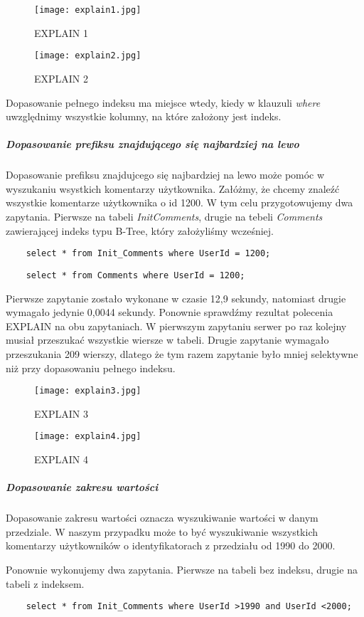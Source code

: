 \begin{figure}[h]
    \texttt{[image: explain1.jpg]} 
    \caption{EXPLAIN 1}
\end{figure}

\begin{figure}[h]
    \texttt{[image: explain2.jpg]} 
    \caption{EXPLAIN 2}
\end{figure}

Dopasowanie pełnego indeksu ma miejsce wtedy, kiedy w klauzuli \textit{where} uwzględnimy wszystkie kolumny, na które założony jest indeks. 
\subparagraph{Dopasowanie prefiksu znajdującego się najbardziej na lewo}\mbox{} 
Dopasowanie prefiksu znajdujcego się najbardziej na lewo może pomóc w wyszukaniu wsystkich komentarzy użytkownika. Załóżmy, że chcemy znaleźć wszystkie komentarze użytkownika o id 1200.
W tym celu przygotowujemy dwa zapytania. Pierwsze na tabeli \textit{Init\textunderscore Comments}, drugie na tebeli \textit{Comments} zawierającej indeks typu B-Tree, który założyliśmy wcześniej.
\begin{verbatim}
    select * from Init_Comments where UserId = 1200;
\end{verbatim}
\begin{verbatim}
    select * from Comments where UserId = 1200;
\end{verbatim}
Pierwsze zapytanie zostało wykonane w czasie 12,9 sekundy, natomiast drugie wymagało jedynie 0,0044 sekundy. Ponownie sprawdźmy rezultat polecenia EXPLAIN na obu zapytaniach. W pierwszym zapytaniu serwer po raz kolejny musiał przeszukać wszystkie wiersze w tabeli. Drugie zapytanie wymagało przeszukania 209 wierszy, dlatego że tym razem zapytanie było mniej selektywne niż przy dopasowaniu pełnego indeksu.
\begin{figure}[h]
    \texttt{[image: explain3.jpg]} 
    \caption{EXPLAIN 3}
\end{figure}

\begin{figure}[h]
    \texttt{[image: explain4.jpg]} 
    \caption{EXPLAIN 4}
\end{figure}

\subparagraph{Dopasowanie zakresu wartości}\mbox{}
Dopasowanie zakresu wartości oznacza wyszukiwanie wartości w danym przedziale. W naszym przypadku może to być wyszukiwanie wszystkich komentarzy użytkowników o identyfikatorach z przedziału od 1990 do 2000.

Ponownie wykonujemy dwa zapytania. Pierwsze na tabeli bez indeksu, drugie na tabeli z indeksem.
\begin{verbatim}
    select * from Init_Comments where UserId >1990 and UserId <2000;
\end{verbatim}

